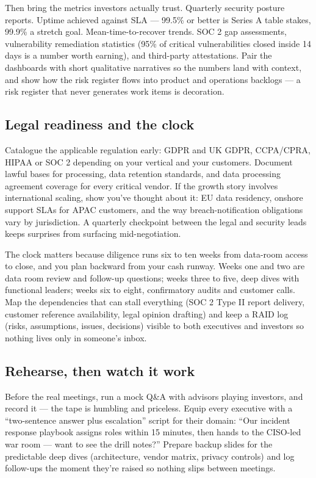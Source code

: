 Then bring the metrics investors actually trust. Quarterly security posture reports. Uptime achieved against SLA — 99.5\% or better is Series A table stakes, 99.9\% a stretch goal. Mean-time-to-recover trends. SOC 2 gap assessments, vulnerability remediation statistics (95\% of critical vulnerabilities closed inside 14 days is a number worth earning), and third-party attestations. Pair the dashboards with short qualitative narratives so the numbers land with context, and show how the risk register flows into product and operations backlogs — a risk register that never generates work items is decoration.



\subsection{Legal readiness and the clock}


Catalogue the applicable regulation early: GDPR and UK GDPR, CCPA/CPRA, HIPAA or SOC 2 depending on your vertical and your customers. Document lawful bases for processing, data retention standards, and data processing agreement coverage for every critical vendor. If the growth story involves international scaling, show you've thought about it: EU data residency, onshore support SLAs for APAC customers, and the way breach-notification obligations vary by jurisdiction. A quarterly checkpoint between the legal and security leads keeps surprises from surfacing mid-negotiation.


The clock matters because diligence runs six to ten weeks from data-room access to close, and you plan backward from your cash runway. Weeks one and two are data room review and follow-up questions; weeks three to five, deep dives with functional leaders; weeks six to eight, confirmatory audits and customer calls. Map the dependencies that can stall everything (SOC 2 Type II report delivery, customer reference availability, legal opinion drafting) and keep a RAID log (risks, assumptions, issues, decisions) visible to both executives and investors so nothing lives only in someone's inbox.



\subsection{Rehearse, then watch it work}


Before the real meetings, run a mock Q\&A with advisors playing investors, and record it — the tape is humbling and priceless. Equip every executive with a ``two-sentence answer plus escalation'' script for their domain: ``Our incident response playbook assigns roles within 15 minutes, then hands to the CISO-led war room — want to see the drill notes?'' Prepare backup slides for the predictable deep dives (architecture, vendor matrix, privacy controls) and log follow-ups the moment they're raised so nothing slips between meetings.


